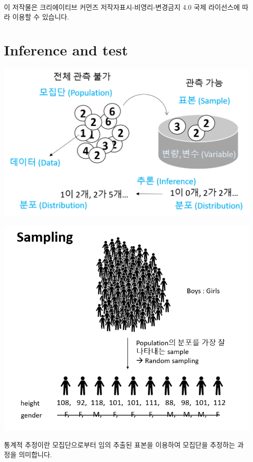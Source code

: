 \documentclass[
]{book}
\begin{document}
이 저작물은 크리에이티브 커먼즈 저작자표시-비영리-변경금지 4.0 국제 라이선스에 따라 이용할 수 있습니다.

\hypertarget{inference-and-test}{%
\chapter{Inference and test}\label{inference-and-test}}

\includegraphics[width=6.25in,height=\textheight]{images/12/04-2.png}

\includegraphics[width=6.25in,height=\textheight]{images/12/06.png}

통계적 추정이란 모집단으로부터 임의 추출된 표본을 이용하여 모집단을 추정하는 과정을 의미합니다.
\end{document}

